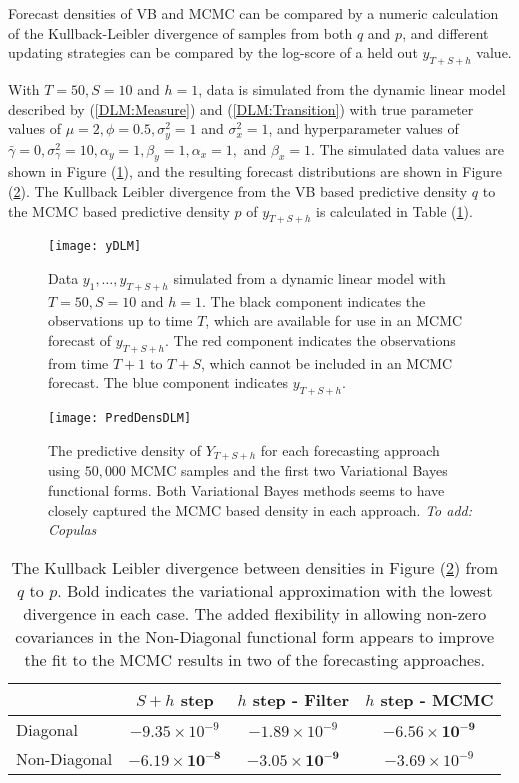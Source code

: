 \documentclass[12pt,a4paper]{article}%
\numberwithin{equation}{section}
\begin{document}
Forecast densities of VB and MCMC can be compared by a numeric calculation of the Kullback-Leibler divergence of samples from both $q$ and $p$, and different updating strategies can be compared by the log-score of a held out $y_{T+S+h}$ value. 

With $T = 50, S = 10$ and $h = 1$, data is simulated from the dynamic linear model described by (\ref{DLM:Measure}) and (\ref{DLM:Transition}) with true parameter values of $\mu = 2, \phi = 0.5, \sigma^2_y = 1$ and $\sigma^2_x = 1$, and hyperparameter values of $ \bar{\gamma} = 0, \sigma^2_{\gamma} = 10, \alpha_y = 1, \beta_y = 1, \alpha_x = 1,$ and $\beta_x = 1$. The simulated data values are shown in Figure (\ref{fig:DLMy}), and the resulting forecast distributions are shown in Figure (\ref{fig:DLMpreddens}). The Kullback Leibler divergence from the VB based predictive density $q$ to the MCMC based predictive density $p$ of $y_{T+S+h}$ is calculated in Table (\ref{Tab:KLdiv}).

\begin{figure}[h]
\centering
\texttt{[image: yDLM]}
\caption{Data $y_{1}, \dots, y_{T+S+h}$ simulated from a dynamic linear model with $T = 50, S = 10$ and $h = 1$. The black component indicates the observations up to time $T$, which are available for use in an MCMC forecast of $y_{T+S+h}$. The red component indicates the observations from time $T+1$ to $T+S$, which cannot be included in an MCMC forecast. The blue component indicates $y_{T+S+h}$.}
\label{fig:DLMy}
\end{figure}

\begin{figure}[h]
\centering
\texttt{[image: PredDensDLM]}
\caption{The predictive density of $Y_{T+S+h}$ for each forecasting approach using $50,000$ MCMC samples and the first two Variational Bayes functional forms. Both Variational Bayes methods seems to have closely captured the MCMC based density in each approach. \textit{To add: Copulas}}
\label{fig:DLMpreddens}
\end{figure}

\begin{table}
\centering
\begin{tabular}{| l | c c c |}
  \hline
  & $S+h$ step & $h$ step - Filter & $h$ step - MCMC \\
  \hline
  Diagonal & $-9.35 \times 10^{-9}$ & $-1.89 \times 10^{-9}$ & $\boldsymbol{-6.56 \times 10^{-9}} $ \\
  Non-Diagonal & $\boldsymbol{-6.19 \times 10^{-8}}$ & $\boldsymbol{-3.05 \times 10^{-9}}$ &$-3.69 \times 10^{-9} $ \\
  \hline
\end{tabular}
\caption{The Kullback Leibler divergence between densities in Figure (\ref{fig:DLMpreddens}) from $q$ to $p$. Bold indicates the variational approximation with the lowest divergence in each case. The added flexibility in allowing non-zero covariances in the Non-Diagonal functional form appears to improve the fit to the MCMC results in two of the forecasting approaches.}
\label{Tab:KLdiv}
\end{table}
\end{document}
